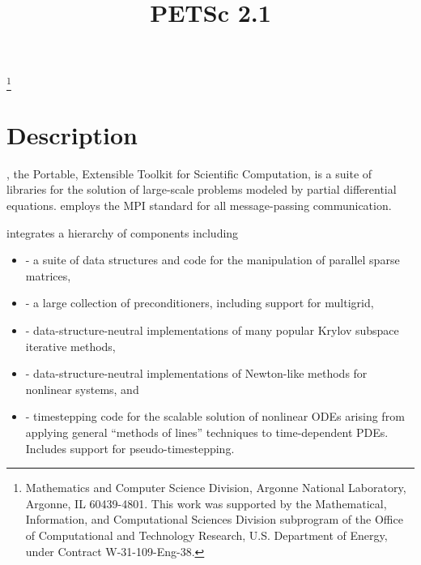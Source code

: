 \pagestyle{empty}

\pagestyle{empty}
\title{PETSc 2.1}
\thanks{Mathematics and Computer Science Division,
Argonne National Laboratory,
Argonne, IL 60439-4801.
This work was supported by the Mathematical,
        Information, and Computational Sciences Division subprogram of
        the Office of Computational and Technology Research,
        U.S. Department of Energy, under Contract W-31-109-Eng-38.}

\date{}
\maketitle

\newcommand{\vsp}{\vspace{-1.5mm}}


\section*{Description}

, the Portable, Extensible Toolkit for Scientific Computation,
is a suite of libraries for
the solution of large-scale problems modeled by partial differential
equations.   employs the MPI standard for all
message-passing communication. 

 integrates a hierarchy of components including
\vspace{-.4cm}
\begin{itemize}
\item {} - a suite of data structures and code
      for the manipulation of parallel sparse matrices,
\vsp
\item {} - a large collection of preconditioners, including support for multigrid,
\vsp
\item {} - data-structure-neutral implementations of
      many popular Krylov subspace iterative methods,
\vsp
\item {} - data-structure-neutral implementations of Newton-like
      methods for nonlinear systems, and
\vsp
\item {} - timestepping code for the scalable solution of
      nonlinear ODEs arising from applying general ``methods of lines'' 
      techniques to time-dependent PDEs. Includes support for 
      pseudo-timestepping. 
\end{itemize}
\vsp

